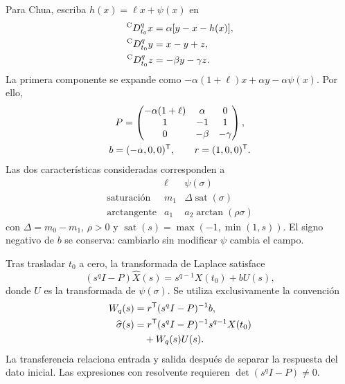 Para Chua, escriba \(h(x)=\ell x+\psi(x)\) en
\begin{equation}
 \begin{aligned}
 {}^{\mathrm C}D_{t_0}^{q}x&=\alpha[y-x-h(x)],\\
 {}^{\mathrm C}D_{t_0}^{q}y&=x-y+z,\\
 {}^{\mathrm C}D_{t_0}^{q}z&=-\beta y-\gamma z.
 \end{aligned}
 \label{bre:bal:chua}
\end{equation}
La primera componente se expande como
\(-\alpha(1+\ell)x+\alpha y-\alpha\psi(x)\). Por ello,
\begin{equation}
 \begin{gathered}
 P=\begin{pmatrix}
 -\alpha(1+\ell)&\alpha&0\\
 1&-1&1\\0&-\beta&-\gamma
 \end{pmatrix},\\
 b=(-\alpha,0,0)^{\mathsf T},\qquad r=(1,0,0)^{\mathsf T}.
 \end{gathered}
 \label{bre:bal:chua-matrices}
\end{equation}
Las dos características consideradas corresponden a
\begin{equation}
 \begin{array}{c|c|c}
 &\ell&\psi(\sigma)\\\hline
 \text{saturación}&m_1&\Delta\operatorname{sat}(\sigma)\\
 \text{arctangente}&a_1&a_2\arctan(\rho\sigma)
 \end{array}
 \label{bre:bal:nonlinearities}
\end{equation}
con \(\Delta=m_0-m_1\), \(\rho>0\) y
\(\operatorname{sat}(s)=\max(-1,\min(1,s))\). El signo negativo de
\(b\) se conserva: cambiarlo sin modificar \(\psi\) cambia el campo.

Tras trasladar \(t_0\) a cero, la transformada de Laplace satisface
\begin{equation}
 (s^qI-P)\widehat X(s)=s^{q-1}X(t_0)+bU(s),
 \label{bre:bal:laplace}
\end{equation}
donde \(U\) es la transformada de \(\psi(\sigma)\). Se utiliza
exclusivamente la convención
\begin{equation}
 \begin{aligned}
 W_q(s)&=r^{\mathsf T}(s^qI-P)^{-1}b,\\
 \widehat\sigma(s)
 &=r^{\mathsf T}(s^qI-P)^{-1}s^{q-1}X(t_0)\\
 &\quad+W_q(s)U(s).
 \end{aligned}
 \label{bre:bal:transfer}
\end{equation}
La transferencia relaciona entrada y salida después de separar la respuesta
del dato inicial. Las expresiones con resolvente requieren
\(\det(s^qI-P)\ne0\).

